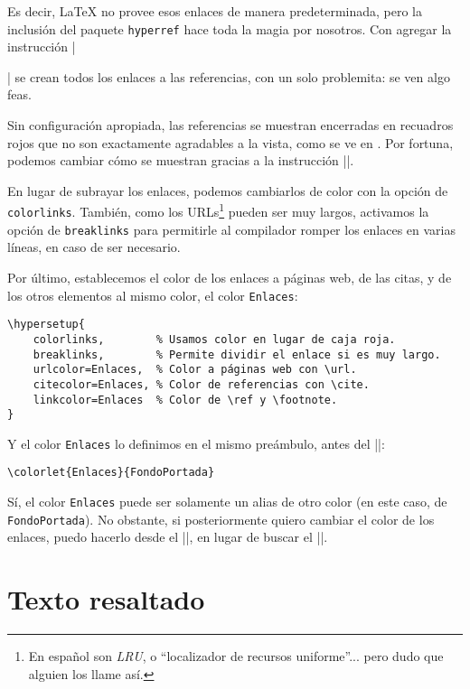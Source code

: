 Es decir, \LaTeX{} no provee esos enlaces de manera predeterminada, pero la inclusión del paquete \texttt{hyperref} hace toda la magia por nosotros. Con agregar la instrucción |\usepackage{hyperref}| se crean todos los enlaces a las referencias, con un solo problemita: se ven algo feas.

Sin configuración apropiada, las referencias se muestran encerradas en recuadros rojos que no son exactamente agradables a la vista, como se ve en \cite{bib:overleaf_hyperref}. Por fortuna, podemos cambiar cómo se muestran gracias a la instrucción |\hypersetup|.

En lugar de subrayar los enlaces, podemos cambiarlos de color con la opción de \texttt{colorlinks}. También, como los URLs\footnote{En español son \emph{LRU}, o ``localizador de recursos uniforme''... pero dudo que alguien los llame así.} pueden ser muy largos, activamos la opción de \texttt{breaklinks} para permitirle al compilador romper los enlaces en varias líneas, en caso de ser necesario.

Por último, establecemos el color de los enlaces a páginas web, de las citas, y de los otros elementos al mismo color, el color \texttt{Enlaces}:

\begin{lstlisting}[style=latex]
\hypersetup{
	colorlinks,        % Usamos color en lugar de caja roja.
	breaklinks,        % Permite dividir el enlace si es muy largo.
	urlcolor=Enlaces,  % Color a páginas web con \url.
	citecolor=Enlaces, % Color de referencias con \cite.
	linkcolor=Enlaces  % Color de \ref y \footnote.
}
\end{lstlisting}

Y el color \texttt{Enlaces} lo definimos en el mismo preámbulo, antes del |\hypersetup|:

\begin{lstlisting}[style=latex]
\colorlet{Enlaces}{FondoPortada}
\end{lstlisting}

Sí, el color \texttt{Enlaces} puede ser solamente un alias de otro color (en este caso, de \texttt{FondoPortada}). No obstante, si posteriormente quiero cambiar el color de los enlaces, puedo hacerlo desde el ||, en lugar de buscar el |\hypersetup|.



\section{Texto resaltado}
\label{sec:texto_resaltado}



